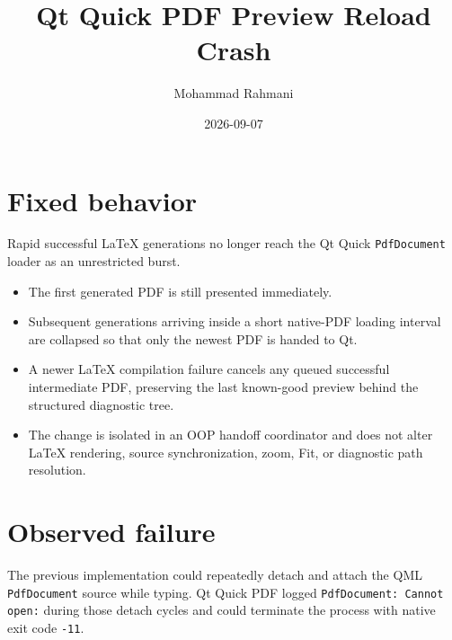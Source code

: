 \documentclass[a4paper]{article}
\title{Qt Quick PDF Preview Reload Crash}
\date{2026-09-07}
\author{Mohammad Rahmani}
\begin{document}
   \maketitle

   \section{Fixed behavior}

   Rapid successful LaTeX generations no longer reach the Qt Quick
   \verb|PdfDocument| loader as an unrestricted burst.

   \begin{itemize}
      \item The first generated PDF is still presented immediately.
      \item Subsequent generations arriving inside a short native-PDF loading
      interval are collapsed so that only the newest PDF is handed to Qt.
      \item A newer LaTeX compilation failure cancels any queued successful
      intermediate PDF, preserving the last known-good preview behind the
      structured diagnostic tree.
      \item The change is isolated in an OOP handoff coordinator and does not
      alter LaTeX rendering, source synchronization, zoom, Fit, or diagnostic
      path resolution.
   \end{itemize}

   \section{Observed failure}

   The previous implementation could repeatedly detach and attach the QML
   \verb|PdfDocument| source while typing. Qt Quick PDF logged
   \verb|PdfDocument: Cannot open:| during those detach cycles and could
   terminate the process with native exit code \verb|-11|.

   
   
\end{document}
